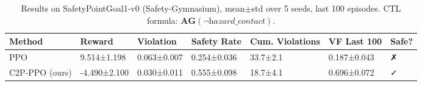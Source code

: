 \begin{table}
\caption{Results on SafetyPointGoal1-v0 (Safety-Gymnasium), mean$\pm$std over 5 seeds, last 100 episodes. CTL formula: $\mathbf{AG}(\neg\textit{hazard\_contact})$.}
\label{tab:pointgoal_results}
\begin{tabular}{lllllll}
\toprule
Method & Reward & Violation & Safety Rate & Cum. Violations & VF Last 100 & Safe? \\
\midrule
PPO & 9.514±1.198 & 0.063±0.007 & 0.254±0.036 & 33.7±2.1 & 0.187±0.043 & ✗ \\
C2P-PPO (ours) & -4.490±2.100 & 0.030±0.011 & 0.555±0.098 & 18.7±4.1 & 0.696±0.072 & ✓ \\
\bottomrule
\end{tabular}
\end{table}
